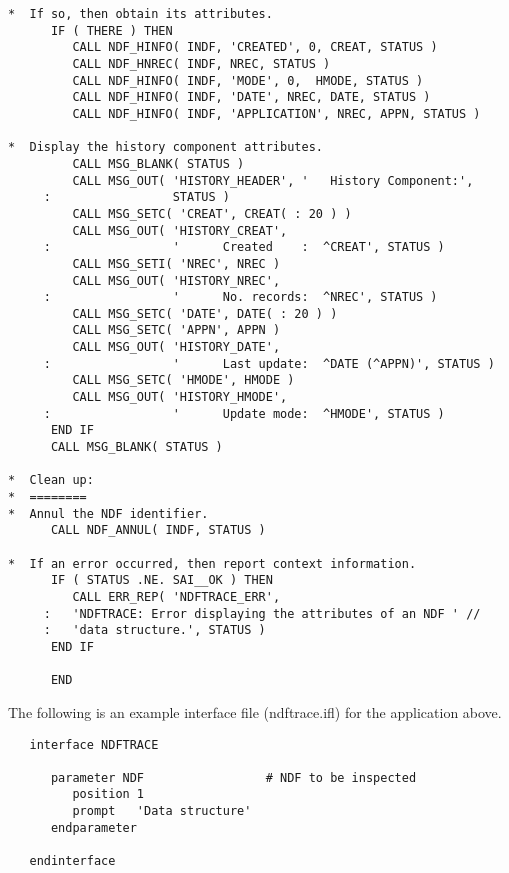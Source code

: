 \begin{verbatim}
*  If so, then obtain its attributes.
      IF ( THERE ) THEN
         CALL NDF_HINFO( INDF, 'CREATED', 0, CREAT, STATUS )
         CALL NDF_HNREC( INDF, NREC, STATUS )
         CALL NDF_HINFO( INDF, 'MODE', 0,  HMODE, STATUS )
         CALL NDF_HINFO( INDF, 'DATE', NREC, DATE, STATUS )
         CALL NDF_HINFO( INDF, 'APPLICATION', NREC, APPN, STATUS )

*  Display the history component attributes.
         CALL MSG_BLANK( STATUS )
         CALL MSG_OUT( 'HISTORY_HEADER', '   History Component:',
     :                 STATUS )
         CALL MSG_SETC( 'CREAT', CREAT( : 20 ) )
         CALL MSG_OUT( 'HISTORY_CREAT',
     :                 '      Created    :  ^CREAT', STATUS )
         CALL MSG_SETI( 'NREC', NREC )
         CALL MSG_OUT( 'HISTORY_NREC',
     :                 '      No. records:  ^NREC', STATUS )
         CALL MSG_SETC( 'DATE', DATE( : 20 ) )
         CALL MSG_SETC( 'APPN', APPN )
         CALL MSG_OUT( 'HISTORY_DATE',
     :                 '      Last update:  ^DATE (^APPN)', STATUS )
         CALL MSG_SETC( 'HMODE', HMODE )
         CALL MSG_OUT( 'HISTORY_HMODE',
     :                 '      Update mode:  ^HMODE', STATUS )
      END IF
      CALL MSG_BLANK( STATUS )

*  Clean up:
*  ========
*  Annul the NDF identifier.
      CALL NDF_ANNUL( INDF, STATUS )

*  If an error occurred, then report context information.
      IF ( STATUS .NE. SAI__OK ) THEN
         CALL ERR_REP( 'NDFTRACE_ERR',
     :   'NDFTRACE: Error displaying the attributes of an NDF ' //
     :   'data structure.', STATUS )
      END IF

      END
\end{verbatim}
\normalsize

The following is an example  interface file
(ndftrace.ifl) for the application above. 

\small
\begin{verbatim}
   interface NDFTRACE

      parameter NDF                 # NDF to be inspected
         position 1
         prompt   'Data structure'
      endparameter

   endinterface
\end{verbatim}
\normalsize


